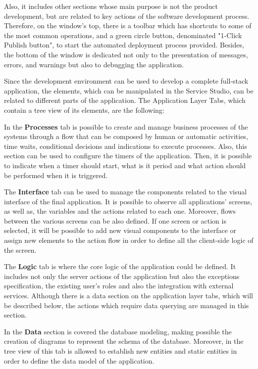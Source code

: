 Also, it includes other sections whose main purpose is not the product development, but are related to key actions of the software development process. Therefore, on the window’s top, there is a toolbar which has shortcuts to some of the most common operations, and a green circle button, denominated "1-Click Publish button", to start the automated deployment process provided. Besides, the bottom of the window is dedicated not only to the presentation of messages, errors, and warnings but also to debugging the application.

Since the development environment can be used to develop a complete full-stack application, the elements, which can be manipulated in the Service Studio, can be related to different parts of the application. The Application Layer Tabs, which contain a tree view of its elements, are the following:

In the \textbf{Processes} tab is possible to create and manage business processes of the systems through a flow that can be composed by human or automatic activities, time waits, conditional decisions and indications to execute processes. Also, this section can be used to configure the timers of the application. Then, it is possible to indicate when a timer should start, what is it period and what action should be performed when it is triggered.

The \textbf{Interface} tab can be used to manage the components related to the visual interface of the final application. It is possible to observe all applications’ screens, as well as, the variables and the actions related to each one. Moreover, flows between the various screens can be also defined. If one screen or action is selected, it will be possible to add new visual components to the interface or assign new elements to the action flow in order to define all the client-side logic of the screen.

The \textbf{Logic} tab is where the core logic of the application could be defined. It includes not only the server actions of the application but also the exceptions specification, the existing user’s roles and also the integration with external services. Although there is a data section on the application layer tabs, which will be described below, the actions which require data querying are managed in this section.

In the \textbf{Data} section is covered the database modeling, making possible the creation of diagrams to represent the schema of the database. Moreover, in the tree view of this tab is allowed to establish new entities and static entities in order to define the data model of the application.

